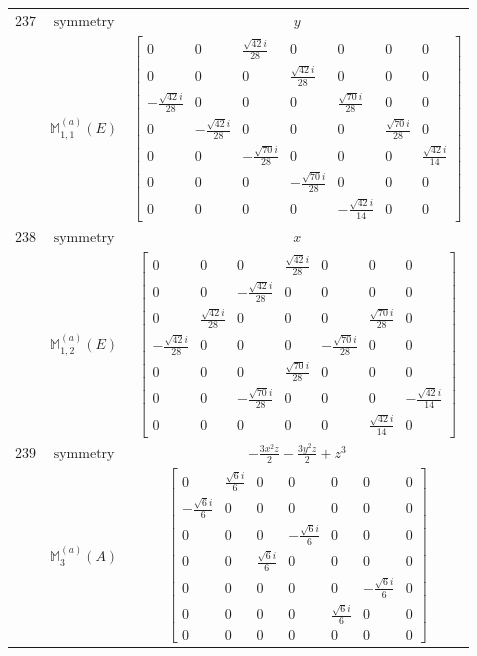\documentclass[fleqn,8pt,landscape]{jsarticle}
\begin{document}
\begin{longtable}{ccc}
$ 237 $ & $ \text{symmetry} $ & $ y $ \\
$  $ & $ \mathbb{M}_{1,1}^{(a)}(E) $ & $ \begin{bmatrix} 0 & 0 & \frac{\sqrt{42} i}{28} & 0 & 0 & 0 & 0 \\ 0 & 0 & 0 & \frac{\sqrt{42} i}{28} & 0 & 0 & 0 \\ - \frac{\sqrt{42} i}{28} & 0 & 0 & 0 & \frac{\sqrt{70} i}{28} & 0 & 0 \\ 0 & - \frac{\sqrt{42} i}{28} & 0 & 0 & 0 & \frac{\sqrt{70} i}{28} & 0 \\ 0 & 0 & - \frac{\sqrt{70} i}{28} & 0 & 0 & 0 & \frac{\sqrt{42} i}{14} \\ 0 & 0 & 0 & - \frac{\sqrt{70} i}{28} & 0 & 0 & 0 \\ 0 & 0 & 0 & 0 & - \frac{\sqrt{42} i}{14} & 0 & 0 \end{bmatrix} $ \\ \hline
$ 238 $ & $ \text{symmetry} $ & $ x $ \\
$  $ & $ \mathbb{M}_{1,2}^{(a)}(E) $ & $ \begin{bmatrix} 0 & 0 & 0 & \frac{\sqrt{42} i}{28} & 0 & 0 & 0 \\ 0 & 0 & - \frac{\sqrt{42} i}{28} & 0 & 0 & 0 & 0 \\ 0 & \frac{\sqrt{42} i}{28} & 0 & 0 & 0 & \frac{\sqrt{70} i}{28} & 0 \\ - \frac{\sqrt{42} i}{28} & 0 & 0 & 0 & - \frac{\sqrt{70} i}{28} & 0 & 0 \\ 0 & 0 & 0 & \frac{\sqrt{70} i}{28} & 0 & 0 & 0 \\ 0 & 0 & - \frac{\sqrt{70} i}{28} & 0 & 0 & 0 & - \frac{\sqrt{42} i}{14} \\ 0 & 0 & 0 & 0 & 0 & \frac{\sqrt{42} i}{14} & 0 \end{bmatrix} $ \\ \hline
$ 239 $ & $ \text{symmetry} $ & $ - \frac{3 x^{2} z}{2} - \frac{3 y^{2} z}{2} + z^{3} $ \\
$  $ & $ \mathbb{M}_{3}^{(a)}(A) $ & $ \begin{bmatrix} 0 & \frac{\sqrt{6} i}{6} & 0 & 0 & 0 & 0 & 0 \\ - \frac{\sqrt{6} i}{6} & 0 & 0 & 0 & 0 & 0 & 0 \\ 0 & 0 & 0 & - \frac{\sqrt{6} i}{6} & 0 & 0 & 0 \\ 0 & 0 & \frac{\sqrt{6} i}{6} & 0 & 0 & 0 & 0 \\ 0 & 0 & 0 & 0 & 0 & - \frac{\sqrt{6} i}{6} & 0 \\ 0 & 0 & 0 & 0 & \frac{\sqrt{6} i}{6} & 0 & 0 \\ 0 & 0 & 0 & 0 & 0 & 0 & 0 \end{bmatrix} $ \\ \hline

\end{longtable}
\end{document}
